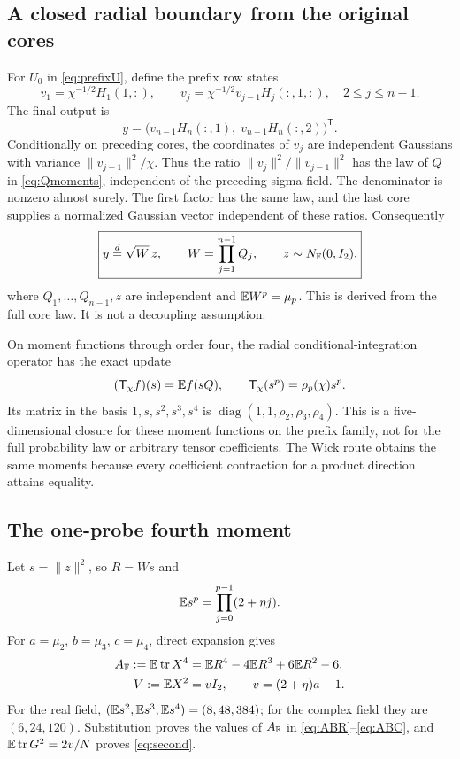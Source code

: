 \documentclass[11pt]{article}
\numberwithin{equation}{section}
\theoremstyle{definition}\newtheorem{definition}[theorem]{Definition}
\theoremstyle{remark}\newtheorem{remark}[theorem]{Remark}
\newcommand{\tr}{\operatorname{tr}}\newcommand{\Ent}{\operatorname{Ent}}
\newcommand{\norm}[1]{\lVert#1\rVert}\newcommand{\ip}[2]{\langle#1,#2\rangle}
\newcommand{\diag}{\operatorname{diag}}
\begin{document}
\subsection{A closed radial boundary from the original cores}
For $U_0$ in \eqref{eq:prefixU}, define the prefix row states
\[
 v_1=\chi^{-1/2}H_1(1,:),\qquad
 v_j=\chi^{-1/2}v_{j-1}H_j(:,1,:),\quad 2\le j\le n-1.
\]
The final output is
\[
 y=\bigl(v_{n-1}H_n(:,1),\;v_{n-1}H_n(:,2)\bigr)^{\mathsf T}.
\]
Conditionally on preceding cores, the coordinates of $v_j$ are independent
Gaussians with variance $\norm{v_{j-1}}^2/\chi$. Thus the ratio
$\norm{v_j}^2/\norm{v_{j-1}}^2$ has the law of $Q$ in \eqref{eq:Qmoments},
independent of the preceding sigma-field. The denominator is nonzero almost
surely. The first factor has the same law, and the last core supplies a
normalized Gaussian vector independent of these ratios. Consequently
\begin{equation}\label{eq:mixture}
 \boxed{\displaystyle
 y\stackrel d=\sqrt W\,z,\qquad
 W=\prod_{j=1}^{n-1}Q_j,\qquad z\sim N_{\mathbb F}(0,I_2),}
\end{equation}
where $Q_1,\ldots,Q_{n-1},z$ are independent and $\mathbb E W^p=\mu_p$.
This is derived from the full core law. It is not a decoupling assumption.

On moment functions through order four, the radial conditional-integration
operator has the exact update
\begin{equation}\label{eq:radialtransfer}
 (\mathsf T_\chi f)(s)=\mathbb E f(sQ),\qquad
 \mathsf T_\chi(s^p)=\rho_p(\chi)s^p.
\end{equation}
Its matrix in the basis $1,s,s^2,s^3,s^4$ is
$\diag(1,1,\rho_2,\rho_3,\rho_4)$.
This is a five-dimensional closure for these moment functions on the prefix
family, not for the full probability law or arbitrary tensor coefficients.
The Wick route obtains the same moments because every coefficient contraction
for a product direction attains equality.

\subsection{The one-probe fourth moment}
Let $s=\norm z^2$, so $R=Ws$ and
\[
 \mathbb E s^p=\prod_{j=0}^{p-1}(2+\eta j).
\]
For $a=\mu_2$, $b=\mu_3$, $c=\mu_4$, direct expansion gives
\begin{align}
 A_{\F}:=\E\tr X^4
 &=\E R^4-4\E R^3+6\E R^2-6,\label{eq:Aexact}\\
 V:=\E X^2&=vI_2,\qquad v=(2+\eta)a-1.\label{eq:Vexact}
\end{align}
For the real field, $(\mathbb E s^2,\mathbb E s^3,\mathbb E s^4)=(8,48,384)$; for the complex
field they are $(6,24,120)$. Substitution proves the values of $A_{\mathbb F}$ in
\eqref{eq:ABR}--\eqref{eq:ABC}, and $\E\tr G^2=2v/N$ proves \eqref{eq:second}.
\end{document}
